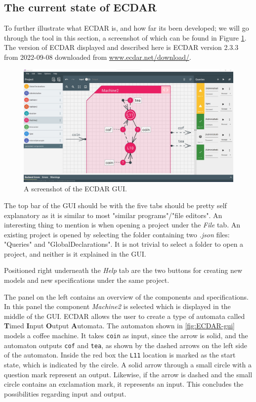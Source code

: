 \subsection{The current state of ECDAR}\label{sub:the-current-state-of-ecdar} %
To further illustrate what ECDAR is, and how far its been developed; we will go through the tool in this section, a screenshot of which can be found in Figure \ref{fig:ECDAR-gui}. 
The version of ECDAR displayed and described here is ECDAR version 2.3.3 from 2022-09-08 downloaded from \href{https://www.ecdar.net/download/}{www.ecdar.net/download/}.

\begin{figure}[H]
    \centering
    \includegraphics[width=1\textwidth]{common/figures/ecdar-overview.jpg}
    \caption{A screenshot of the ECDAR GUI.}
    \label{fig:ECDAR-gui}
\end{figure}
The top bar of the GUI should be with the five tabs should be pretty self explanatory as it is similar to most "similar programs"/"file editors".
An interesting thing to mention is when opening a project under the \textit{File} tab.
An existing project is opened by selecting the folder containing two \textit{.json} files: "Queries" and "GlobalDeclarations".
It is not trivial to select a folder to open a project, and neither is it explained in the GUI.

Positioned right underneath the \textit{Help} tab are the two buttons for creating new models and new specifications under the same project.

The panel on the left contains an overview of the components and specifications. 
In this panel the component \textit{Machine2} is selected which is displayed in the middle of the GUI.
ECDAR allows the user to create a type of automata called \textbf{T}imed \textbf{I}nput \textbf{O}utput \textbf{A}utomata. 
The automaton shown in \autoref{fig:ECDAR-gui} models a coffee machine.
It takes \texttt{coin} as input, since the arrow is solid, and the automaton outputs \texttt{cof} and \texttt{tea}, as shown by the dashed arrows on the left side of the automaton.
Inside the red box the \texttt{L11} location is marked as the start state, which is indicated by the circle.
A solid arrow through a small circle with a question mark represent an output. 
Likewise, if the arrow is dashed and the small circle contains an exclamation mark, it represents an input.
This concludes the possibilities regarding input and output.

